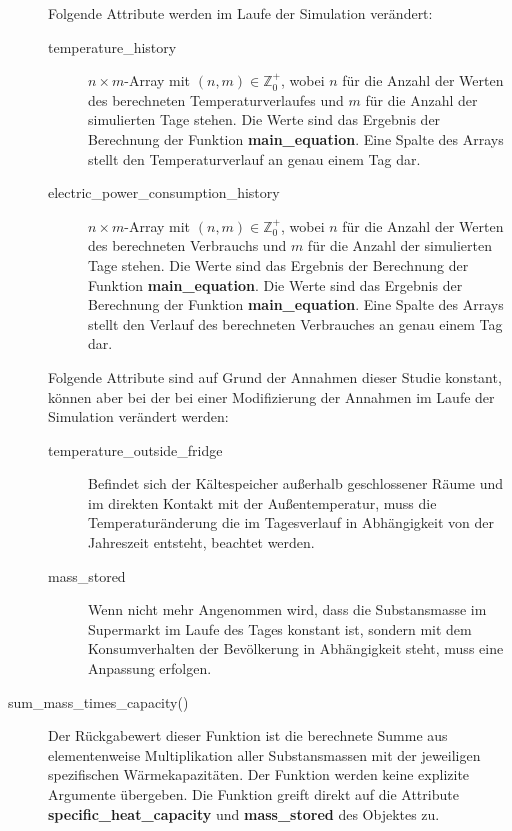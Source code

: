 \begin{description}
	Folgende Attribute werden im Laufe der Simulation ver\"andert:
	\begin{description}
		\item[temperature\_history] $n \times m$-Array mit $(n,m)\in
		\mathbb{Z}^+_0$, wobei $n$ f\"ur die Anzahl der Werten des
		berechneten Temperaturverlaufes und $m$ f\"ur die Anzahl der
		simulierten Tage stehen. Die Werte sind
		das Ergebnis der Berechnung der Funktion
		\textbf{main\_equation}. Eine Spalte des Arrays stellt den
		Temperaturverlauf an genau einem Tag dar.
		\item[electric\_power\_consumption\_history] $n \times m$-Array
		mit $(n,m)\in \mathbb{Z}^+_0$, wobei $n$ f\"ur die Anzahl der
		Werten des berechneten Verbrauchs und $m$ f\"ur die
		Anzahl der simulierten Tage stehen. Die
		Werte sind das Ergebnis der Berechnung der Funktion
		\textbf{main\_equation}. Die Werte sind das Ergebnis der
		Berechnung der Funktion \textbf{main\_equation}. Eine Spalte des
		Arrays stellt den Verlauf des berechneten Verbrauches an genau
		einem Tag dar.
	\end{description}

	Folgende Attribute sind auf Grund der Annahmen dieser Studie konstant,
	k\"onnen aber bei der bei einer Modifizierung der Annahmen im Laufe der
	Simulation ver\"andert werden:
	\begin{description}
		\item[temperature\_outside\_fridge] Befindet sich der
		K\"altespeicher au\ss erhalb geschlossener R\"aume und im
		direkten Kontakt mit der Au\ss entemperatur, muss die
		Temperatur\"anderung die im Tagesverlauf in Abh\"angigkeit von
		der Jahreszeit entsteht, beachtet werden.
		\item[mass\_stored] Wenn nicht mehr Angenommen wird, dass
		die Substansmasse im Supermarkt im Laufe des Tages konstant ist,
		sondern mit dem Konsumverhalten der Bev\"olkerung in
		Abh\"angigkeit steht, muss eine Anpassung erfolgen.
	\end{description}

	\item[sum\_mass\_times\_capacity()] Der R\"uckgabewert dieser Funktion
	ist die berechnete Summe aus elementenweise Multiplikation aller
	Substansmassen mit der jeweiligen spezifischen W\"armekapazit\"aten. Der
	Funktion werden keine explizite Argumente \"ubergeben. Die Funktion
	greift direkt auf die Attribute \textbf{specific\_heat\_capacity} und
	\textbf{mass\_stored} des Objektes zu.


\end{description}

